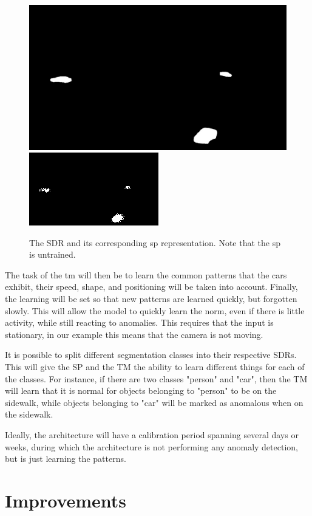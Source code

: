 \begin{figure}[H]
    \centering
    \includegraphics[width=.48\textwidth]{resources/methodology/car_segmentation.png}
    \includegraphics[width=.48\textwidth]{resources/methodology/car_segmentation_sp.png}
    \caption[SDR and SP Representation]{The SDR and its corresponding \gls*{sp} representation. Note that the \gls*{sp} is untrained.}
\end{figure}
\par
The task of the \gls*{tm} will then be to learn the common patterns that the cars exhibit, their speed, shape, and positioning will be taken into account. Finally, the learning will be set so that new patterns are learned quickly, but forgotten slowly. This will allow the model to quickly learn the norm, even if there is little activity, while still reacting to anomalies. This requires that the input is stationary, in our example this means that the camera is not moving.
\par
It is possible to split different segmentation classes into their respective SDRs. This will give the SP and the TM the ability to learn different things for each of the classes. For instance, if there are two classes "person" and "car", then the TM will learn that it is normal for objects belonging to "person" to be on the sidewalk, while objects belonging to "car" will be marked as anomalous when on the sidewalk.
\par
Ideally, the architecture will have a calibration period spanning several days or weeks, during which the architecture is not performing any anomaly detection, but is just learning the patterns.
\section{Improvements}
